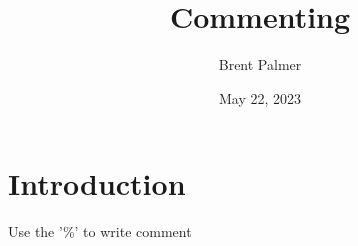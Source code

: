 \documentclass[]{article}
\title{Commenting}
\author{Brent Palmer}
\date{May 22, 2023}
\begin{document}
\maketitle

\section{Introduction}

Use the '\%' to write comment


\lipsum[2] %

\iffalse

\lipsum[3-6]

\lipsum[7-8]

\fi


\begin{comment}

\lipsum[3-6]

\lipsum[7-8]

\end{comment}

\end{document}
